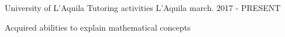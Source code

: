 


\begin{cventries}


\cventry
{University of L'Aquila} %
{Tutoring activities} %
{L'Aquila} %
{march. 2017 - PRESENT} %
{ %
\begin{cvitems}
\item {Acquired abilities to explain mathematical concepts}
\end{cvitems}
}




\end{cventries}